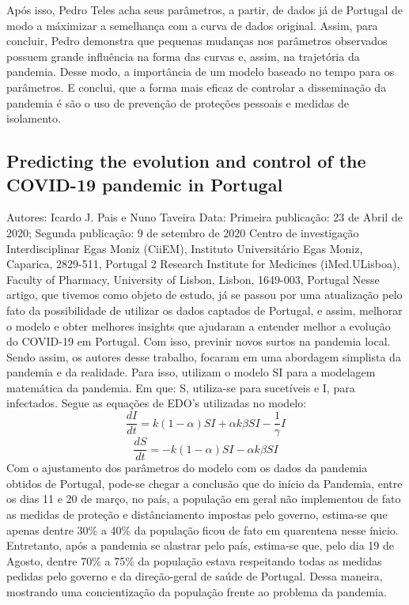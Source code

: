 \documentclass[12pt]{article}
\begin{document}
\newline
\newpage
Após isso, Pedro Teles acha seus parâmetros, a partir, de dados já de Portugal de modo a máximizar a semelhança com a curva de dados original.
\newline
\newline
Assim, para concluir, Pedro demonstra que pequenas mudanças nos parâmetros observados possuem grande influência na forma das curvas e, assim, na trajetória da pandemia. Desse modo, a importância de um modelo baseado no tempo para os parâmetros. E conclui, que a forma mais eficaz de controlar a disseminação da pandemia é são o uso de prevenção de proteções pessoais e medidas de isolamento.
\subsection{Predicting the evolution and control of the COVID-19
pandemic in Portugal \cite{ref03}}
Autores: Icardo J. Pais e Nuno Taveira \newline
Data: Primeira publicação: 23 de Abril de 2020; Segunda publicação: 9 de setembro de 2020 \newline
Centro de investigação Interdisciplinar Egas Moniz (CiiEM), Instituto Universitário Egas Moniz, Caparica, 2829-511, Portugal
2
\newline Research Institute for Medicines (iMed.ULisboa), Faculty of Pharmacy, University of Lisbon, Lisbon, 1649-003, Portugal
\newline
\newline
Nesse artigo, que tivemos como objeto de estudo, já se passou por uma atualização pelo fato da possibilidade de utilizar os dados captados de Portugal, e assim, melhorar o modelo e obter melhores insights que ajudaram a entender melhor a evolução do COVID-19 em Portugal. Com isso, previnir novos surtos na pandemia local.
\newline \newline
Sendo assim, os autores desse trabalho, focaram em uma abordagem simplista da pandemia e da realidade. Para isso, utilizam o modelo SI para a modelagem matemática da pandemia. Em que: S, utiliza-se para sucetíveis e I, para infectados. Segue as equações de EDO's utilizadas no modelo:
\[ \frac{dI}{dt} = k(1-\alpha) SI + \alpha k \beta S I - \frac{1}{\gamma} I \]
\[ \frac{dS}{dt} = -k(1-\alpha) SI - \alpha k \beta S I \]
Com o ajustamento dos parâmetros do modelo com os dados da pandemia obtidos de Portugal, pode-se chegar a conclusão que do início da Pandemia, entre os dias 11 e 20 de março, no país, a população em geral não implementou de fato as medidas de proteção e distânciamento impostas pelo governo, estima-se que apenas dentre 30\% a 40\% da população ficou de fato em quarentena nesse ínicio. Entretanto, após a pandemia se alastrar pelo país, estima-se que, pelo dia 19 de Agosto, dentre 70\% a 75\% da população estava respeitando todas as medidas pedidas pelo governo e da direção-geral de saúde de Portugal. Dessa maneira, mostrando uma concientização da população frente ao problema da pandemia.
\end{document}
